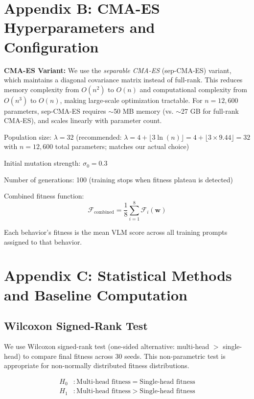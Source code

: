 \documentclass{article}
\begin{document}
\section*{Appendix B: CMA-ES Hyperparameters and Configuration}
\label{app:cmaes}

\textbf{CMA-ES Variant:} We use the \textit{separable CMA-ES} (sep-CMA-ES) variant, which maintains a diagonal covariance matrix instead of full-rank. This reduces memory complexity from $O(n^2)$ to $O(n)$ and computational complexity from $O(n^3)$ to $O(n)$, making large-scale optimization tractable. For $n = 12,600$ parameters, sep-CMA-ES requires $\sim$50 MB memory (vs. $\sim$27 GB for full-rank CMA-ES), and scales linearly with parameter count.

Population size: $\lambda = 32$ (recommended: $\lambda = 4 + \lfloor 3 \ln(n) \rfloor = 4 + \lfloor 3 \times 9.44 \rfloor = 32$ with $n = 12,600$ total parameters; matches our actual choice)

Initial mutation strength: $\sigma_0 = 0.3$

Number of generations: 100 (training stops when fitness plateau is detected)

Combined fitness function:
\begin{equation}
\mathcal{F}_{\text{combined}} = \frac{1}{8} \sum_{i=1}^{8} \mathcal{F}_i(\mathbf{w})
\end{equation}

Each behavior's fitness is the mean VLM score across all training prompts assigned to that behavior.

\section*{Appendix C: Statistical Methods and Baseline Computation}
\label{app:statistical_methods}

\subsection{Wilcoxon Signed-Rank Test}

We use Wilcoxon signed-rank test (one-sided alternative: multi-head $>$ single-head) to compare final fitness across 30 seeds. This non-parametric test is appropriate for non-normally distributed fitness distributions.

\begin{align*}
H_0 &: \text{Multi-head fitness} = \text{Single-head fitness} \\
H_1 &: \text{Multi-head fitness} > \text{Single-head fitness}
\end{align*}
\end{document}

